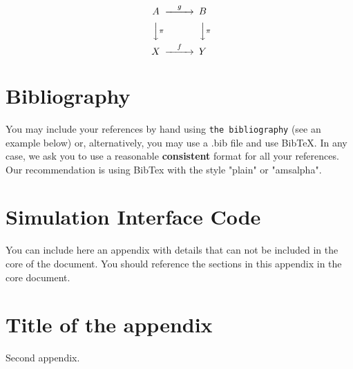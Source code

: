 \documentclass[12,twoside]{TFG-GM}
\theoremstyle{definition}
\theoremstyle{remark}
\begin{document}
\[
\begin{CD}
A @>g>> B\\
@VV\pi V @VV\pi V\\
X @>f>> Y
\end{CD}
\]


\section{Bibliography}

You may include your references by hand using {\tt the bibliography} (see an example below) or, alternatively, you may use a .bib file and use BibTeX. In any case, we ask you to use a reasonable {\bf consistent} format for all your references. Our recommendation is using BibTex with the style   "plain" or "amsalpha".


{}


\appendix
\vfill\newpage \section{Simulation Interface Code}
\label{app:code}
You can include here an appendix with details that can not be included in the core of the document. You should reference the sections in this appendix in the core document.
\vfill\newpage \section{Title of the appendix}
Second appendix.
\end{document}
